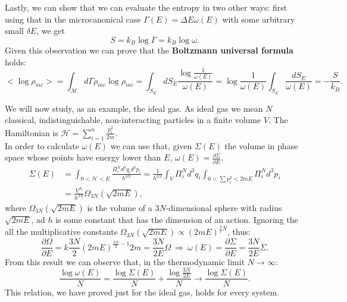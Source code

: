 Lastly, we can show that we can evaluate the entropy in two other ways: first using that in the microcanonical case $\Gamma(E)=\Delta E\omega(E)$ with some arbitrary small $\delta E$, we get
\begin{equation*}
    S=k_B\log\Gamma=k_B\log\omega.
\end{equation*}
Given this observation we can prove that the \textbf{Boltzmann universal formula} holds:
\begin{equation*}
    \big<\log\rho_{mc}\big>=\int_{\mathcal{M} } d\Gamma\rho_{mc} \log\rho_{mc}=\int_{S_E}dS_E \frac{\log\frac{1}{\omega(E)}}{\omega(E)}=\log\frac{1}{\omega(E)}\int_{S_E} \frac{dS_E}{\omega(E)}=-\frac{S}{k_B}.
\end{equation*}
\begin{example}
    We will now study, as an example, the ideal gas. As ideal gas we mean $N$ classical, indistinguishable, non-interacting particles in a finite volume $V$. The Hamiltonian is $\mathcal{H} =\sum_{i=1}^n\frac{p_i^2}{2m}$.\\ In order to calculate $\omega(E)$ we can use that, given $\Sigma(E)$ the volume in phase space whose points have energy lower than $E$, $\omega(E)=\frac{\partial \Sigma}{\partial E}$.
    \begin{align*}
        \Sigma(E)&=\int_{0<\mathcal{H} <E}\frac{\Pi^N_id^3q_id^3p_i}{h^{3N}}=\frac{1}{h^{3N}}\int_{V}\Pi^N_id^3q_i\int_{0<\sum p_i^2<2mE}\Pi^N_id^3p_i\\&=\frac{V^N}{h^{3N}}\Omega_{3N}(\sqrt{2mE}),
    \end{align*} 
    where $\Omega_{3N}(\sqrt{2mE})$ is the volume of a $3N$-dimensional sphere with radius $\sqrt{2mE}$, ad $h$ is some constant that has the dimension of an action. Ignoring the all the multiplicative constants $\Omega_{3N}(\sqrt{2mE})\propto (2mE)^{\frac{3}{2}N}$, thus:\begin{equation*}
       \frac{\partial\Omega}{\partial E}=k\frac{3N}{2}(2mE)^{\frac{3N}{2}-1}2m=\frac{3N}{2E}\Omega\ \Rightarrow\ \omega(E)= \frac{\partial\Sigma}{\partial E}=\frac{3N}{2E}\Sigma.
    \end{equation*}
    From this result we can observe that, in the thermodynamic limit $N\rightarrow\infty$:
    \begin{equation*}
        \frac{\log\omega(E)}{N}=\frac{\log\Sigma(E)}{N}+\frac{\log\frac{3N}{2E}}{N}\rightarrow\frac{\log\Sigma(E)}{N}.
    \end{equation*}
    This relation, we have proved just for the ideal gas, holds for every system.\\

\end{example}
